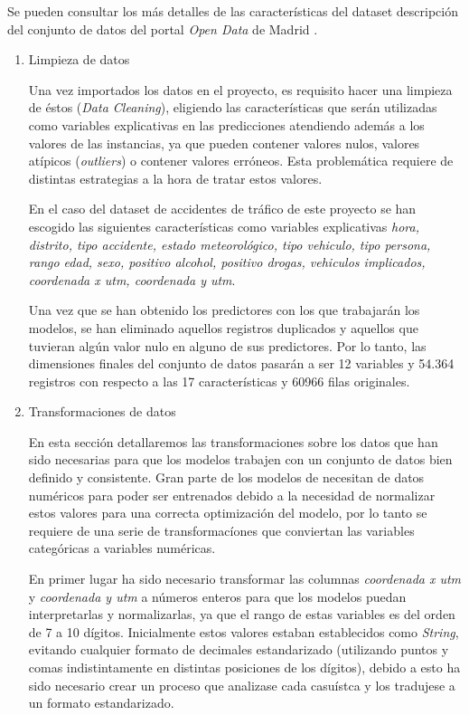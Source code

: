             Se pueden consultar los más detalles de las características del dataset descripción del conjunto de datos del portal \textit{Open Data} de Madrid \cite{InfoDatasetMadrid}.


            \begin{enumerate}

                \item Limpieza de datos

                    Una vez importados los datos en el proyecto, es requisito hacer una limpieza de éstos (\textit{Data Cleaning}), eligiendo las características que serán utilizadas como variables explicativas en las predicciones atendiendo además a los valores de las instancias, ya que pueden contener valores nulos, valores atípicos (\textit{outliers}) o contener valores erróneos. Esta problemática requiere de distintas estrategias a la hora de tratar estos valores.

                    En el caso del dataset de accidentes de tráfico de este proyecto se han escogido las siguientes características como variables explicativas \textit{hora, distrito, tipo accidente, estado meteorológico, tipo vehiculo, tipo persona, rango edad, sexo, positivo alcohol, positivo drogas, vehiculos implicados, coordenada x utm, coordenada y utm}.


                    Una vez que se han obtenido los predictores con los que trabajarán los modelos, se han eliminado aquellos registros duplicados y aquellos que tuvieran algún valor nulo en alguno de sus predictores. Por lo tanto, las dimensiones finales del conjunto de datos pasarán a ser 12 variables y 54.364 registros con respecto a las 17 características y 60966 filas originales. 

                \item Transformaciones de datos

                    En esta sección detallaremos las transformaciones sobre los datos que han sido necesarias para que los modelos trabajen con un conjunto de datos bien definido y consistente. Gran parte de los modelos de  necesitan de datos numéricos para poder ser entrenados debido a la necesidad de normalizar estos valores para una correcta optimización del modelo, por lo tanto se requiere de una serie de transformacíones que conviertan las variables categóricas a variables numéricas.

                    En primer lugar ha sido necesario transformar las columnas \textit{coordenada x utm} y \textit{coordenada y utm} a números enteros para que los modelos puedan interpretarlas y normalizarlas, ya que el rango de estas variables es del orden de 7 a 10 dígitos. Inicialmente estos valores estaban establecidos como \textit{String}, evitando cualquier formato de decimales estandarizado (utilizando puntos y comas indistintamente en distintas posiciones de los dígitos), debido a esto ha sido necesario crear un proceso que analizase cada casuístca y los tradujese a un formato estandarizado.


\end{enumerate}
